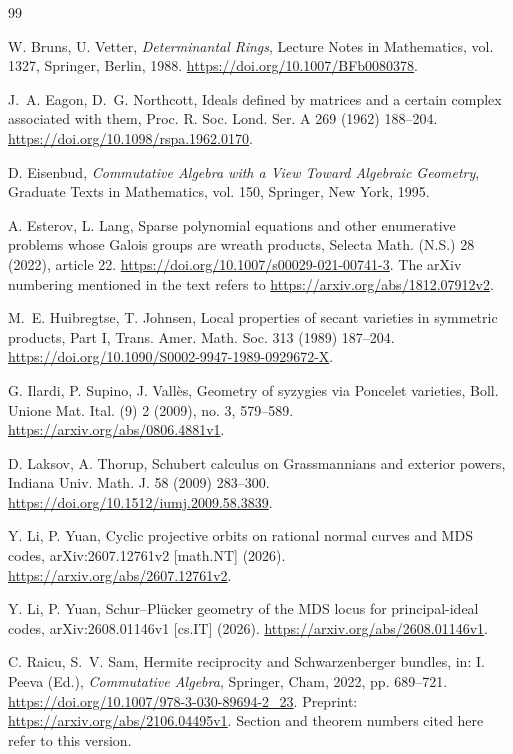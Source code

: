 \documentclass[10pt,fleqn]{article}
\numberwithin{equation}{section}
\begin{document}
\begin{thebibliography}{99}


W. Bruns, U. Vetter,
\emph{Determinantal Rings},
Lecture Notes in Mathematics, vol. 1327, Springer, Berlin, 1988.
\newblock \url{https://doi.org/10.1007/BFb0080378}.

J.~A. Eagon, D.~G. Northcott,
Ideals defined by matrices and a certain complex associated with them,
Proc. R. Soc. Lond. Ser. A 269 (1962) 188--204.
\newblock \url{https://doi.org/10.1098/rspa.1962.0170}.

D. Eisenbud,
\emph{Commutative Algebra with a View Toward Algebraic Geometry},
Graduate Texts in Mathematics, vol. 150, Springer, New York, 1995.

A. Esterov, L. Lang,
Sparse polynomial equations and other enumerative problems whose Galois groups are wreath
products,
Selecta Math. (N.S.) 28 (2022), article 22.
\newblock \url{https://doi.org/10.1007/s00029-021-00741-3}.
\newblock The arXiv numbering mentioned in the text refers to
\url{https://arxiv.org/abs/1812.07912v2}.

M.~E. Huibregtse, T. Johnsen,
Local properties of secant varieties in symmetric products, Part I,
Trans. Amer. Math. Soc. 313 (1989) 187--204.
\newblock \url{https://doi.org/10.1090/S0002-9947-1989-0929672-X}.

G. Ilardi, P. Supino, J. Vall\`es,
Geometry of syzygies via Poncelet varieties,
Boll. Unione Mat. Ital. (9) 2 (2009), no. 3, 579--589.
\newblock \url{https://arxiv.org/abs/0806.4881v1}.

D. Laksov, A. Thorup,
Schubert calculus on Grassmannians and exterior powers,
Indiana Univ. Math. J. 58 (2009) 283--300.
\newblock \url{https://doi.org/10.1512/iumj.2009.58.3839}.

Y. Li, P. Yuan,
Cyclic projective orbits on rational normal curves and MDS codes,
arXiv:2607.12761v2 [math.NT] (2026).
\newblock \url{https://arxiv.org/abs/2607.12761v2}.

Y. Li, P. Yuan,
Schur--Pl\"ucker geometry of the MDS locus for principal-ideal codes,
arXiv:2608.01146v1 [cs.IT] (2026).
\newblock \url{https://arxiv.org/abs/2608.01146v1}.

C. Raicu, S.~V. Sam,
Hermite reciprocity and Schwarzenberger bundles,
in: I. Peeva (Ed.), \emph{Commutative Algebra}, Springer, Cham, 2022,
pp. 689--721.
\newblock \url{https://doi.org/10.1007/978-3-030-89694-2_23}.
Preprint: \url{https://arxiv.org/abs/2106.04495v1}.
Section and theorem numbers cited here refer to this version.


\end{thebibliography}
\end{document}
